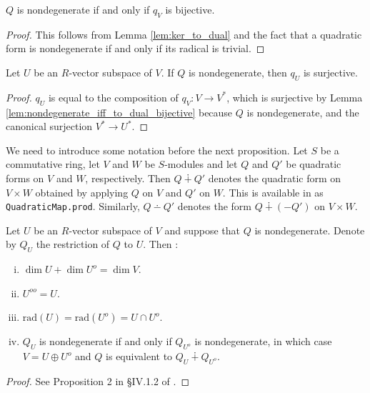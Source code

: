 \begin{lemma}\label{lem:nondegenerate_iff_to_dual_bijective}
\leanok
$Q$ is nondegenerate if and only if $q_V$ is bijective.
\end{lemma}
\begin{proof}
\leanok
This follows from Lemma \ref{lem:ker_to_dual} and the fact that a quadratic form is nondegenerate if and only if its radical is trivial.
\end{proof}

\begin{lemma}\label{lem:to_dual_surjective}
Let $U$ be an $R$-vector subspace of $V$. If $Q$ is nondegenerate, then $q_U$ is surjective.
\leanok
{}
\end{lemma}
\begin{proof}
\leanok 
$q_U$ is equal to the composition of $q_V : V \to V^*$, which is surjective by Lemma \ref{lem:nondegenerate_iff_to_dual_bijective} because $Q$ is nondegenerate, and the canonical surjection $V^* \to U^*$.
\end{proof}

We need to introduce some notation before the next proposition. Let $S$ be a commutative ring, let $V$ and $W$ be $S$-modules and let $Q$ and $Q'$ be quadratic forms on $V$ and $W$, respectively. Then $Q \dotplus Q'$ denotes the quadratic form on $V \times W$ obtained by applying $Q$ on $V$ and $Q'$ on $W$. This is available in \mathlib as \texttt{QuadraticMap.prod}. Similarly, $Q \dotminus Q'$ denotes the form $Q \dotplus (-Q')$ on $V \times W$.

\begin{proposition}\label{prop:ortho_compl_properties}
\leanok
{}
Let $U$ be an $R$-vector subspace of $V$ and suppose that $Q$ is nondegenerate. Denote by $Q_U$ the restriction of $Q$ to $U$. Then :
\begin{enumerate}[(i)]
\item $\dim U + \dim U^o = \dim V$.
\item $U^{oo} = U$.
\item $\text{rad}(U) = \text{rad}(U^o) = U \cap U^o$.
\item $Q_U$ is nondegenerate if and only if $Q_{U^o}$ is nondegenerate, in which case $V = U \oplus U^o$ and $Q$ is equivalent to $Q_U \dotplus Q_{U^o}$.
\end{enumerate}
\end{proposition}
\begin{proof}
\leanok
{}
See Proposition 2 in \S IV.1.2 of \cite{Ser73}.
\end{proof}

